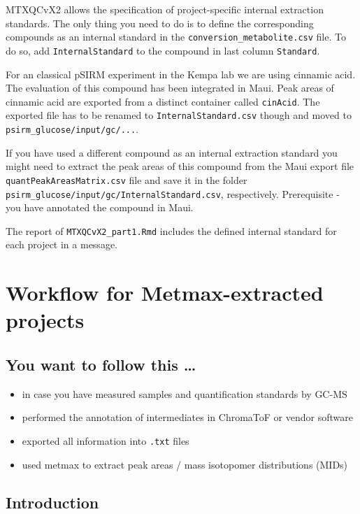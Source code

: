\documentclass[]{book}
\providecommand{\tightlist}{%
  \setlength{\itemsep}{0pt}\setlength{\parskip}{0pt}}
\theoremstyle{definition}
\theoremstyle{definition}
\theoremstyle{definition}
\theoremstyle{remark}
\begin{document}
MTXQCvX2 allows the specification of project-specific internal
extraction standards. The only thing you need to do is to define the
corresponding compounds as an internal standard in the
\texttt{conversion\_metabolite.csv} file. To do so, add
\texttt{InternalStandard} to the compound in last column
\texttt{Standard}.

For an classical pSIRM experiment in the Kempa lab we are using cinnamic
acid. The evaluation of this compound has been integrated in Maui. Peak
areas of cinnamic acid are exported from a distinct container called
\texttt{cinAcid}. The exported file has to be renamed to
\texttt{InternalStandard.csv} though and moved to
\texttt{psirm\_glucose/input/gc/...}.

If you have used a different compound as an internal extraction standard
you might need to extract the peak areas of this compound from the Maui
export file \texttt{quantPeakAreasMatrix.csv} file and save it in the
folder \texttt{psirm\_glucose/input/gc/InternalStandard.csv},
respectively. Prerequisite - you have annotated the compound in Maui.

The report of \texttt{MTXQCvX2\_part1.Rmd} includes the defined internal
standard for each project in a message.

\hypertarget{wf:metmax}{\chapter{Workflow for Metmax-extracted
projects}\label{wf:metmax}}

\section{You want to follow this
\ldots{}}\label{you-want-to-follow-this}

\begin{itemize}
\tightlist
\item
  in case you have measured samples and quantification standards by
  GC-MS
\item
  performed the annotation of intermediates in ChromaToF or vendor
  software
\item
  exported all information into \texttt{.txt} files
\item
  used metmax to extract peak areas / mass isotopomer distributions
  (MIDs)
\end{itemize}

\section{Introduction}\label{introduction}
\end{document}
